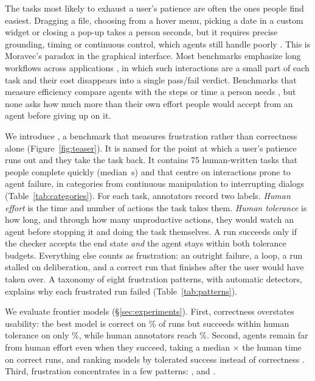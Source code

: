 The tasks most likely to exhaust a user's patience are often the ones people find easiest. Dragging a file, choosing from a hover menu, picking a date in a custom widget or closing a pop-up takes a person seconds, but it requires precise grounding, timing or continuous control, which agents still handle poorly \citep{li2025screenspotpro,zhang2025popups,guan2026componentbench}. This is Moravec's paradox \citep{moravec1988mind} in the graphical interface. Most benchmarks emphasize long workflows across applications \citep{xie2024osworld,xu2024theagentcompany,yuan2026osworld2}, in which such interactions are a small part of each task and their cost disappears into a single pass/fail verdict. Benchmarks that measure efficiency compare agents with the steps or time a person needs \citep{abhyankar2026osworldhuman,guan2026componentbench,arcprize2026arcagi3}, but none asks how much more than their own effort people would accept from an agent before giving up on it.

We introduce \bench, a benchmark that measures frustration rather than correctness alone (Figure~\ref{fig:teaser}). It is named for the point at which a user's patience runs out and they take the task back. It contains 75 human-written tasks that people complete quickly (median \,s) and that centre on interactions prone to agent failure, in  categories from continuous manipulation to interrupting dialogs (Table~\ref{tab:categories}). For each task,  annotators record two labels. \emph{Human effort} is the time and number of actions the task takes them. \emph{Human tolerance} is how long, and through how many unproductive actions, they would watch an agent before stopping it and doing the task themselves. A run succeeds only if the checker accepts the end state \emph{and} the agent stays within both tolerance budgets. Everything else counts as frustration: an outright failure, a loop, a run stalled on deliberation, and a correct run that finishes after the user would have taken over. A taxonomy of eight frustration patterns, with automatic detectors, explains why each frustrated run failed (Table~\ref{tab:patterns}).

We evaluate  frontier models (\S\ref{sec:experiments}).  First, correctness overstates usability: the best model is correct on \% of runs but succeeds within human tolerance on only \%, while human annotators reach \%. Second, agents remain far from human effort even when they succeed, taking a median $\times$ the human time on correct runs, and ranking models by tolerated success instead of correctness . Third, frustration concentrates in a few patterns: , and .

